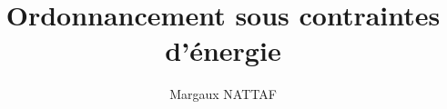 \documentclass[11pt,a4paper,svgnames]{book}
\title{\textbf{\large Ordonnancement sous contraintes d'énergie}}
\author{Margaux NATTAF}
\begin{document}
\makeflyleaf
\doparttoc
\tableofcontents
\listoffigures
\listoftables
\listofalgorithms








\end{document}
